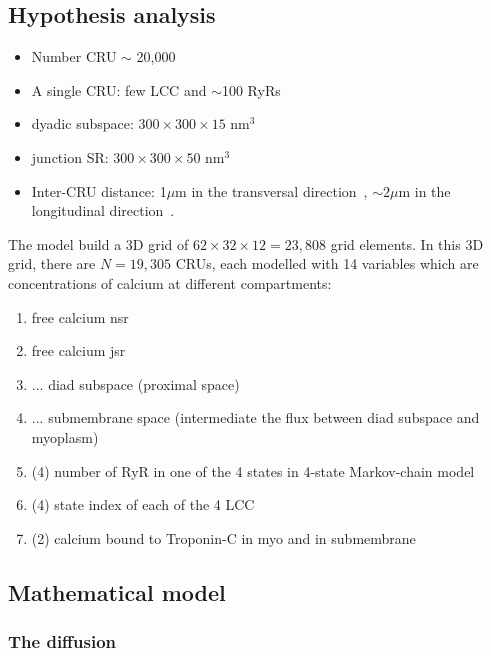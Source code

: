 \subsection{Hypothesis analysis}
\label{sec:hypothesis-analysis-7}

\begin{itemize}
\item Number CRU $\sim$ 20,000~\citep{bers2001ecc}
\item A single CRU: few LCC and $\sim$100 RyRs
\item dyadic subspace: $300\times 300\times 15$ nm$^3$
\item junction SR: $300\times 300\times 50$ nm$^3$
\item Inter-CRU distance: 1$\mu$m in the transversal
  direction~\citep{chen-izu2006tdd}, $\sim 2\mu$m in the longitudinal
  direction~\citep{parker1996csi}.
\end{itemize}

The model build a 3D grid of $62\times 32\times12 = 23,808$ grid
elements. In this 3D grid, there are $N=19,305$ CRUs, each modelled
with 14 variables which are concentrations of calcium at different
compartments:
\begin{enumerate}
\item free calcium nsr
\item free calcium jsr
\item ... diad subspace (proximal space)
\item ... submembrane space (intermediate the flux between diad
  subspace and myoplasm)
\item (4) number of RyR in one of the 4 states in 4-state Markov-chain
  model
\item (4) state index of each of the 4 LCC
\item (2) calcium bound to Troponin-C in myo and in submembrane
\end{enumerate}





\subsection{Mathematical model}
\label{sec:mathematical-model-12}


\subsubsection{The diffusion}
\label{sec:diffusion-1}


